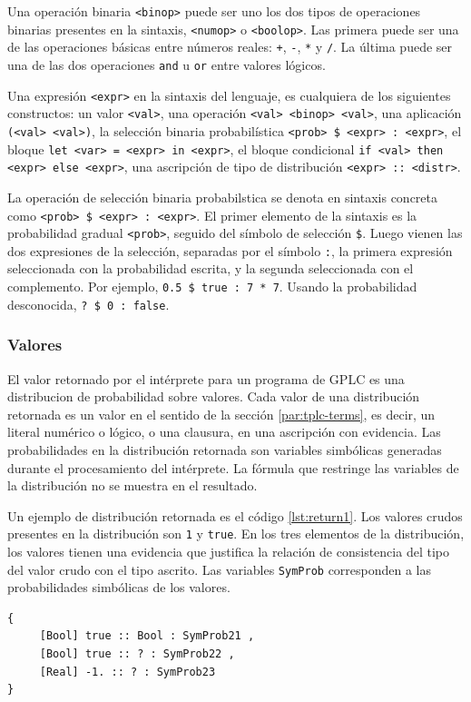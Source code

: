Una operación binaria \lstinline|<binop>| puede ser uno los dos tipos de operaciones binarias presentes en la sintaxis, \lstinline|<numop>| o \lstinline|<boolop>|. Las primera puede ser una de las operaciones básicas entre números reales: \lstinline|+|, \lstinline|-|, \lstinline|*| y \lstinline|/|. La última puede ser una de las dos operaciones \lstinline|and| u \lstinline|or| entre valores lógicos.

Una expresión \lstinline|<expr>| en la sintaxis del lenguaje, es cualquiera de los siguientes constructos: un valor \lstinline|<val>|, una operación \lstinline|<val> <binop> <val>|, una aplicación \lstinline|(<val> <val>)|, la selección binaria probabilística \lstinline|<prob> $ <expr> : <expr>|, el bloque \lstinline|let <var> = <expr> in <expr>|, el bloque condicional \lstinline|if <val> then <expr> else <expr>|, una ascripción de tipo de distribución \lstinline|<expr> :: <distr>|.

La operación de selección binaria probabilstica se denota en sintaxis concreta como \lstinline|<prob> $ <expr> : <expr>|.  El primer elemento de la sintaxis es la probabilidad gradual \lstinline|<prob>|, seguido del símbolo de selección \lstinline|$|. Luego vienen las dos expresiones de la selección, separadas por el símbolo \lstinline|:|, la primera expresión seleccionada con la probabilidad escrita, y la segunda seleccionada con el complemento. Por ejemplo, \lstinline|0.5 $ true : 7 * 7|. Usando la probabilidad desconocida, \lstinline|? $ 0 : false|.


\subsubsection{Valores}
El valor retornado por el intérprete para un programa de GPLC es una
distribucion de probabilidad sobre valores. Cada valor de una
distribución retornada es un valor en el sentido de la sección
\ref{par:tplc-terms}, es decir, un literal numérico o lógico, o
una clausura, en una ascripción con evidencia. Las probabilidades en la distribución retornada son variables simbólicas generadas durante el
procesamiento del intérprete. La fórmula que restringe las variables de la distribución no se muestra en el resultado.

Un ejemplo de distribución retornada es el código \ref{lst:return1}. Los valores crudos presentes en la distribución son \lstinline|1| y \lstinline|true|. En los tres elementos de la distribución, los valores tienen una evidencia que justifica la relación de consistencia del tipo del valor crudo con el tipo ascrito. Las variables \lstinline|SymProb| corresponden a las probabilidades simbólicas de los valores.
\begin{lstlisting}[style=gplc-style,caption={choice 5.1},label={lst:return1}]
{
	 [Bool] true :: Bool : SymProb21 ,
	 [Bool] true :: ? : SymProb22 ,
	 [Real] -1. :: ? : SymProb23 
}  
\end{lstlisting}


